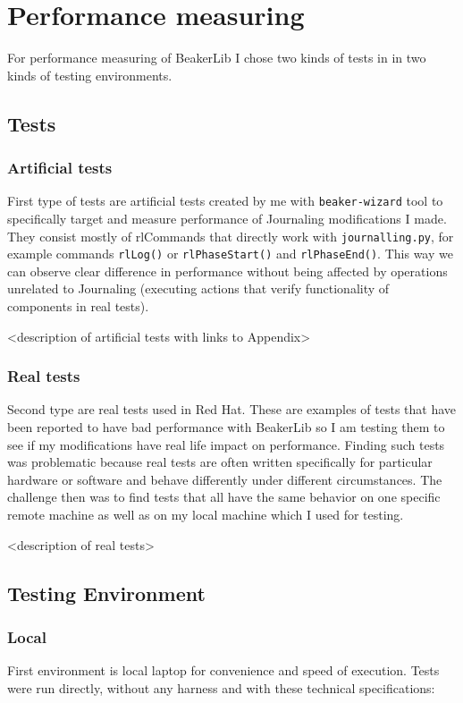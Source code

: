 \chapter{Performance measuring}
\label{performance}

For performance measuring of BeakerLib I chose two kinds of tests in in two kinds of testing environments.

\section{Tests}

\subsection{Artificial tests}
First type of tests are artificial tests created by me with \texttt{beaker-wizard} tool to specifically target and measure performance of Journaling modifications I made. They consist mostly of rlCommands that directly work with \texttt{journalling.py}, for example commands \texttt{rlLog()} or \texttt{rlPhaseStart()} and \texttt{rlPhaseEnd()}. This way we can observe clear difference in performance without being affected by operations unrelated to Journaling (executing actions that verify functionality of components in real tests). 

<description of artificial tests with links to Appendix>

\subsection{Real tests}
Second type are real tests used in Red Hat. These are examples of tests that have been reported to have bad performance with BeakerLib so I am testing them to see if my modifications have real life impact on performance. Finding such tests was problematic because real tests are often written specifically for particular hardware or software and behave differently under different circumstances. The challenge then was to find tests that all have the same behavior on one specific remote machine as well as on my local machine which I used for testing.

<description of real tests>

\section{Testing Environment}

\subsection{Local}
First environment is local laptop for convenience and speed of execution. Tests were run directly, without any harness and with these technical specifications:  %

